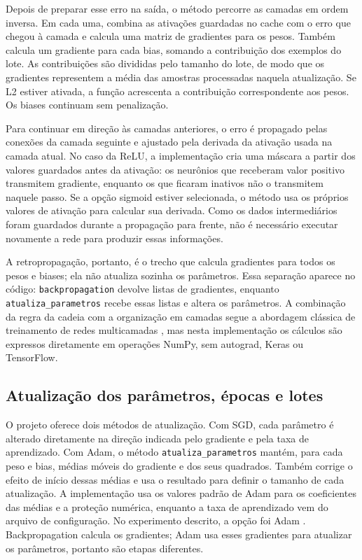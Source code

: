 \documentclass[12pt]{article}
\begin{document}
Depois de preparar esse erro na saída, o método percorre as camadas em ordem inversa. Em cada uma, combina as ativações guardadas no cache com o erro que chegou à camada e calcula uma matriz de gradientes para os pesos. Também calcula um gradiente para cada bias, somando a contribuição dos exemplos do lote. As contribuições são divididas pelo tamanho do lote, de modo que os gradientes representem a média das amostras processadas naquela atualização. Se L2 estiver ativada, a função acrescenta a contribuição correspondente aos pesos. Os biases continuam sem penalização.

Para continuar em direção às camadas anteriores, o erro é propagado pelas conexões da camada seguinte e ajustado pela derivada da ativação usada na camada atual. No caso da ReLU, a implementação cria uma máscara a partir dos valores guardados antes da ativação: os neurônios que receberam valor positivo transmitem gradiente, enquanto os que ficaram inativos não o transmitem naquele passo. Se a opção sigmoid estiver selecionada, o método usa os próprios valores de ativação para calcular sua derivada. Como os dados intermediários foram guardados durante a propagação para frente, não é necessário executar novamente a rede para produzir essas informações.

A retropropagação, portanto, é o trecho que calcula gradientes para todos os pesos e biases; ela não atualiza sozinha os parâmetros. Essa separação aparece no código: \texttt{backpropagation} devolve listas de gradientes, enquanto \texttt{atualiza\_parametros} recebe essas listas e altera os parâmetros. A combinação da regra da cadeia com a organização em camadas segue a abordagem clássica de treinamento de redes multicamadas \cite{rumelhart1986}, mas nesta implementação os cálculos são expressos diretamente em operações NumPy, sem autograd, Keras ou TensorFlow.

\subsection{Atualização dos parâmetros, épocas e lotes}

O projeto oferece dois métodos de atualização. Com SGD, cada parâmetro é alterado diretamente na direção indicada pelo gradiente e pela taxa de aprendizado. Com Adam, o método \texttt{atualiza\_parametros} mantém, para cada peso e bias, médias móveis do gradiente e dos seus quadrados. Também corrige o efeito de início dessas médias e usa o resultado para definir o tamanho de cada atualização. A implementação usa os valores padrão de Adam para os coeficientes das médias e a proteção numérica, enquanto a taxa de aprendizado vem do arquivo de configuração. No experimento descrito, a opção foi Adam \cite{kingma2015}. Backpropagation calcula os gradientes; Adam usa esses gradientes para atualizar os parâmetros, portanto são etapas diferentes.
\end{document}
